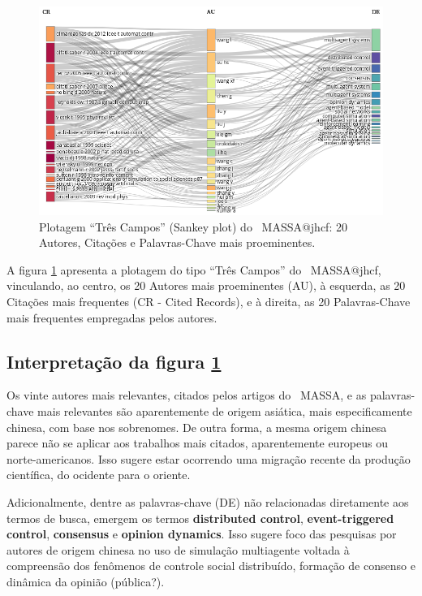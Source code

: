 \begin{figure}
    \centering
    \includegraphics[angle=0,width=1\textwidth]{experiments/jhcf/PesqBibliogr/SimulacaoMultiagente/WoS-20210803/classico-mais-citacoes/Dataset/ThreeFieldPlot-AU-CR-DE-20-20-20.png}
    \caption{Plotagem ``Três Campos'' (Sankey plot) do \dataset\   MASSA@jhcf: 20 Autores, Citações e Palavras-Chave mais proeminentes.}
    \label{fig:MASSA@jhcf:ThreeFieldPlot}
\end{figure}

A figura \ref{fig:MASSA@jhcf:ThreeFieldPlot} apresenta a plotagem do tipo ``Três Campos'' do \dataset\   MASSA@jhcf, vinculando, ao centro, os 20 Autores mais proeminentes (AU), à esquerda, as 20 Citações mais frequentes (CR - Cited Records), e à direita, as 20 Palavras-Chave mais frequentes empregadas pelos autores.

\subsection{Interpretação da figura \ref{fig:MASSA@jhcf:ThreeFieldPlot}}

Os vinte autores mais relevantes, citados pelos artigos do \dataset\ MASSA, e as palavras-chave mais relevantes são aparentemente de origem asiática, mais especificamente chinesa, com base nos sobrenomes. De outra forma, a mesma origem chinesa parece não se aplicar aos trabalhos mais citados, aparentemente europeus ou norte-americanos. Isso sugere estar ocorrendo uma migração recente da produção científica, do ocidente para o oriente. 

Adicionalmente, dentre as palavras-chave (DE) não relacionadas diretamente aos termos de busca, emergem os termos \textbf{distributed control}, \textbf{event-triggered control}, \textbf{consensus} e \textbf{opinion dynamics}. Isso sugere foco das pesquisas por autores de origem chinesa no uso de simulação multiagente voltada à compreensão dos fenômenos de controle social distribuído, formação de consenso e dinâmica da opinião (pública?).

